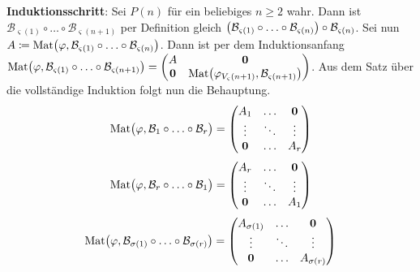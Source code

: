 \documentclass{scrreprt}
\newcommand\Mat{\text{Mat}}
\begin{document}
\begin{enumerate}[(i)]
  \textbf{Induktionsschritt}: Sei $P(n)$ für ein beliebiges $n \geq 2$ wahr.
  Dann ist
  $\mathcal{B}_{\varsigma(1)} \circ \ldots \circ \mathcal{B}_{\varsigma(n + 1)}$
  per Definition gleich $\qty\big(
    \mathcal{B}_{\varsigma(1)} \circ \ldots \circ \mathcal{B}_{\varsigma(n)}
  ) \circ \mathcal{B}_{\varsigma(n)}$.
  Sei nun $A \coloneqq \Mat\qty\big(
    \varphi,
    \mathcal{B}_{\varsigma(1)} \circ \ldots \circ \mathcal{B}_{\varsigma(n)}
  )$.
  Dann ist per dem Induktionsanfang $\Mat\qty\big(
    \varphi,
    \mathcal{B}_{\varsigma(1)} \circ \ldots \circ \mathcal{B}_{\varsigma(n + 1)}
  ) = \begin{pmatrix}
    A & \textbf{0} \\
    \textbf{0} & \Mat\qty\big(\varphi_{V_\varsigma(n + 1)}, \mathcal{B}_{\varsigma(n + 1)}) \\
  \end{pmatrix}$.
  Aus dem Satz über die vollständige Induktion folgt nun die Behauptung.
  \[
    \Mat\qty\big(\varphi, \mathcal{B}_1 \circ \ldots \circ \mathcal{B}_r)
    = \begin{pmatrix}
      A_1 & \ldots & \textbf{0} \\
      \vdots & \ddots & \vdots \\
      \textbf{0} & \ldots & A_r \\
    \end{pmatrix}
  \]
  \[
    \Mat\qty\big(\varphi, \mathcal{B}_r \circ \ldots \circ \mathcal{B}_1)
    = \begin{pmatrix}
      A_r & \ldots & \textbf{0} \\
      \vdots & \ddots & \vdots \\
      \textbf{0} & \ldots & A_1 \\
    \end{pmatrix}
  \]
  \[
    \Mat\qty\big(\varphi, \mathcal{B}_{\sigma(1)} \circ \ldots \circ \mathcal{B}_{\sigma(r)})
    = \begin{pmatrix}
      A_{\sigma(1)} & \ldots & \textbf{0} \\
      \vdots & \ddots & \vdots \\
      \textbf{0} & \ldots & A_{\sigma(r)}\\
    \end{pmatrix}
  \]
\end{enumerate}
\end{document}
